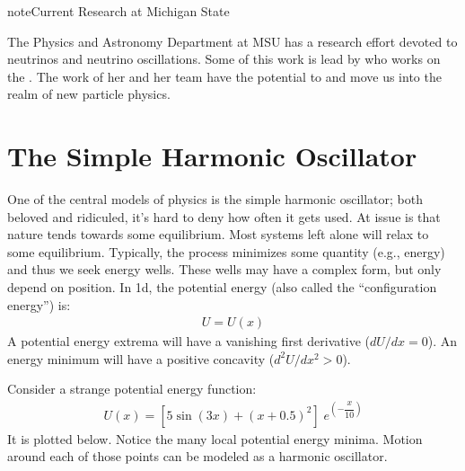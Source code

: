 \documentclass[letterpaper,10pt,english]{jupyterBook}
\begin{document}
\begin{sphinxadmonition}{note}{Current Research at Michigan State}

\sphinxAtStartPar
The Physics and Astronomy Department at MSU has a research effort devoted to neutrinos and neutrino oscillations. Some of this work is lead by  who works on the . The work of her and her team have the potential to  and move us into the realm of new particle physics.
\end{sphinxadmonition}


\section{The Simple Harmonic Oscillator}
\label{\detokenize{content/2_oscillations/readings-oscillators:the-simple-harmonic-oscillator}}
\sphinxAtStartPar
One of the central models of physics is the simple harmonic oscillator; both beloved and ridiculed, it’s hard to deny how often it gets used. At issue is that nature tends towards some equilibrium. Most systems left alone will relax to some equilibrium. Typically, the process minimizes some quantity (e.g., energy) and thus we seek energy wells. These wells may have a complex form, but only depend on position. In 1d, the potential energy (also called the “configuration energy”) is:
\begin{equation*}
\begin{split}U = U(x)\end{split}
\end{equation*}
\sphinxAtStartPar
A potential energy extrema will have a vanishing first derivative (\(dU/dx=0\)). An energy minimum will have a positive concavity (\(d^2U/dx^2>0\)).

\sphinxAtStartPar
Consider a strange potential energy function:
\begin{equation*}
\begin{split}U(x)= \left[5\sin(3x)+(x+0.5)^2\right]\;e^{(-\dfrac{x}{10})}\end{split}
\end{equation*}
\sphinxAtStartPar
It is plotted below. Notice the many local potential energy minima. Motion around each of those points can be modeled as a harmonic oscillator.
\end{document}
